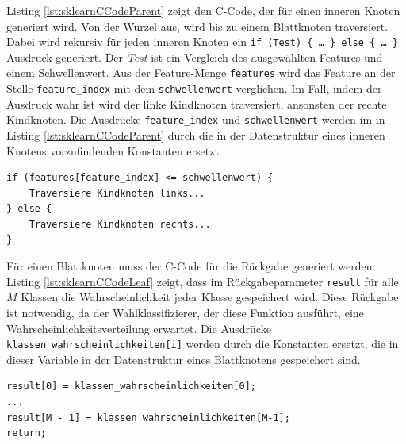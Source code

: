 Listing \ref{lst:sklearnCCodeParent} zeigt den C-Code, der für einen inneren Knoten generiert wird. Von der Wurzel aus, wird bis zu einem Blattknoten traversiert. Dabei wird rekursiv für jeden inneren
Knoten ein \texttt{if (Test) \{ \ldots\ \} else \{ \ldots\ \}} Ausdruck generiert. Der \textit{Test} ist ein Vergleich des ausgewählten Features und einem Schwellenwert. Aus der Feature-Menge \texttt{features}
wird das Feature an der Stelle \texttt{feature\_index} mit dem \texttt{schwellenwert} verglichen. Im Fall, indem der Ausdruck wahr ist wird der linke Kindknoten traversiert, ansonsten der rechte Kindknoten.
Die Ausdrücke \texttt{feature\_index} und \texttt{schwellenwert} werden im in Listing \ref{lst:sklearnCCodeParent} durch die in der Datenstruktur eines inneren Knotens vorzufindenden Konstanten ersetzt.
\begin{lstlisting}[label=lst:sklearnCCodeParent,caption={C-Code eines inneren Knotens.}]
if (features[feature_index] <= schwellenwert) {
    Traversiere Kindknoten links...
} else {
    Traversiere Kindknoten rechts...
}
\end{lstlisting}
Für einen Blattknoten muss der C-Code für die Rückgabe generiert werden. Listing \ref{lst:sklearnCCodeLeaf} zeigt, dass im Rückgabeparameter \texttt{result} für alle $M$ Klassen die Wahrscheinlichkeit
jeder Klasse gespeichert wird. Diese Rückgabe ist notwendig, da der Wahlklassifizierer, der diese Funktion ausführt, eine Wahrscheinlichkeitsverteilung erwartet.
Die Ausdrücke \texttt{klassen\_wahrscheinlichkeiten[i]} werden durch die Konstanten ersetzt, die in dieser Variable in der Datenstruktur eines Blattknotens gespeichert sind.
\begin{lstlisting}[label=lst:sklearnCCodeLeaf,caption={C-Code eines Blattknotens.}]
result[0] = klassen_wahrscheinlichkeiten[0];
...
result[M - 1] = klassen_wahrscheinlichkeiten[M-1];
return;
\end{lstlisting}

